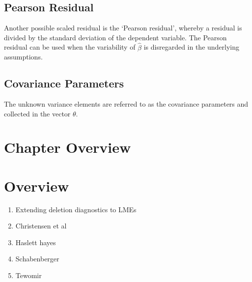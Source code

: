 \documentclass[12pt, a4paper]{report}
\theoremstyle{plain}
\theoremstyle{definition}
\theoremstyle{remark}
\begin{document}
\subsection{Pearson Residual}%

Another possible scaled residual is the  `Pearson residual', whereby a residual is divided by the standard deviation of the dependent variable. The Pearson residual can be used when the variability of $\hat{\beta}$ is disregarded in the underlying assumptions.


\subsection{Covariance Parameters} %
The unknown variance elements are referred to as the covariance parameters and collected in the vector $\theta$.
	
	\section{Chapter Overview}
		\section{Overview}
		\begin{enumerate}
			\item Extending deletion diagnostics to LMEs
			\item Christensen et al
			\item Haslett hayes
			\item Schabenberger
			\item Tewomir
		\end{enumerate}
		
\end{document}
